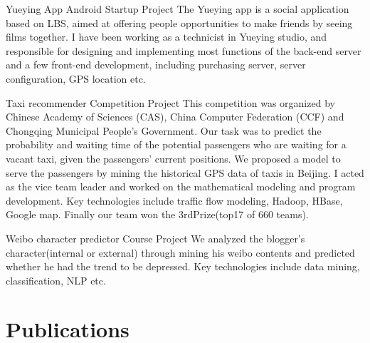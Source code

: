 \documentclass[11pt,a4paper]{moderncv}
\begin{document}
{Yueying App}
{Android}
{Startup Project}{}
{
The Yueying app is a social application based on LBS, aimed at offering people opportunities to make friends by seeing films together. I have been working as a technicist in Yueying studio, and responsible for designing and implementing most functions of the back-end server and a few front-end development, including purchasing server, server configuration, GPS location etc.
}

\vspace*{0.2\baselineskip}
{Taxi recommender}
{}
{Competition Project}{}
{
This competition was organized by Chinese Academy of Sciences (CAS), China Computer Federation (CCF) and Chongqing Municipal People’s Government. Our task was to predict the probability and waiting time of the potential passengers who are waiting for a vacant taxi, given the passengers’ current positions. We proposed a model to serve the passengers by mining the historical GPS data of taxis in Beijing. I acted as the vice team leader and worked on the mathematical modeling and program development. Key technologies include traffic flow modeling, Hadoop, HBase, Google map. Finally our team won the 3rdPrize(top17 of 660 teams).
}

\vspace*{0.2\baselineskip}
{Weibo character predictor}
{}
{Course Project}{}
{
We analyzed the blogger's character(internal or external) through mining his weibo contents and predicted whether he had the trend to be depressed. Key technologies include data mining, classification, NLP etc.
}





\section{Publications}
\end{document}
